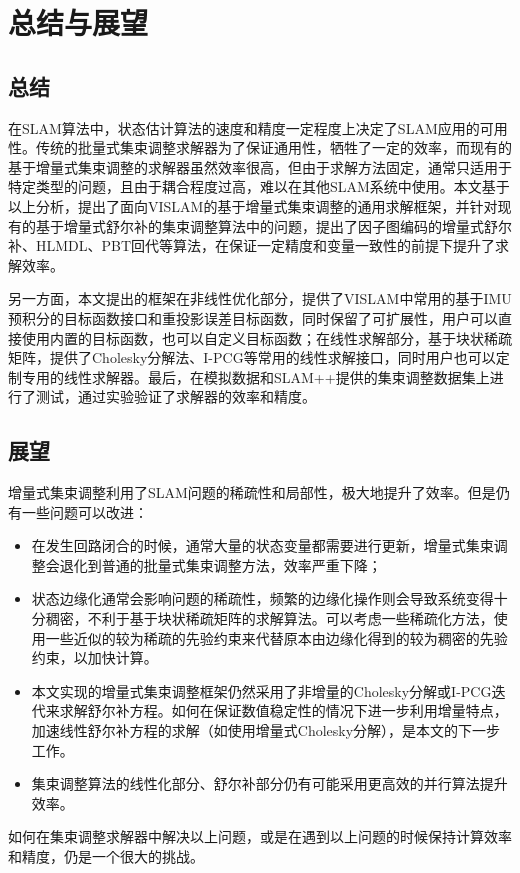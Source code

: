 \chapter{总结与展望}\label{ch:con}

\section{总结}

在SLAM算法中，状态估计算法的速度和精度一定程度上决定了SLAM应用的可用性。传统的批量式集束调整求解器为了保证通用性，牺牲了一定的效率，而现有的基于增量式集束调整的求解器虽然效率很高，但由于求解方法固定，通常只适用于特定类型的问题，且由于耦合程度过高，难以在其他SLAM系统中使用。本文基于以上分析，提出了面向VISLAM的基于增量式集束调整的通用求解框架，并针对现有的基于增量式舒尔补的集束调整算法中的问题，提出了因子图编码的增量式舒尔补、HLMDL、PBT回代等算法，在保证一定精度和变量一致性的前提下提升了求解效率。

另一方面，本文提出的框架在非线性优化部分，提供了VISLAM中常用的基于IMU预积分的目标函数接口和重投影误差目标函数，同时保留了可扩展性，用户可以直接使用内置的目标函数，也可以自定义目标函数；在线性求解部分，基于块状稀疏矩阵，提供了Cholesky分解法、I-PCG等常用的线性求解接口，同时用户也可以定制专用的线性求解器。最后，在模拟数据和SLAM++提供的集束调整数据集上进行了测试，通过实验验证了求解器的效率和精度。

\section{展望}

增量式集束调整利用了SLAM问题的稀疏性和局部性，极大地提升了效率。但是仍有一些问题可以改进：
\begin{itemize}
    \item 在发生回路闭合的时候，通常大量的状态变量都需要进行更新，增量式集束调整会退化到普通的批量式集束调整方法，效率严重下降；
    \item 状态边缘化通常会影响问题的稀疏性，频繁的边缘化操作则会导致系统变得十分稠密，不利于基于块状稀疏矩阵的求解算法。可以考虑一些稀疏化方法，使用一些近似的较为稀疏的先验约束来代替原本由边缘化得到的较为稠密的先验约束，以加快计算。
    \item 本文实现的增量式集束调整框架仍然采用了非增量的Cholesky分解或I-PCG迭代来求解舒尔补方程。如何在保证数值稳定性的情况下进一步利用增量特点，加速线性舒尔补方程的求解（如使用增量式Cholesky分解），是本文的下一步工作。
    \item 集束调整算法的线性化部分、舒尔补部分仍有可能采用更高效的并行算法提升效率。
\end{itemize}
如何在集束调整求解器中解决以上问题，或是在遇到以上问题的时候保持计算效率和精度，仍是一个很大的挑战。
